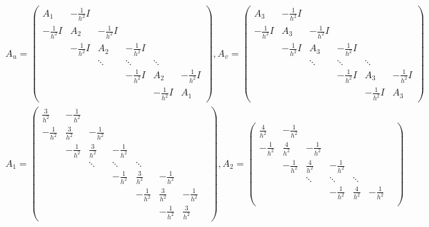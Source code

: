 \documentclass{article}
\begin{document}
\begin{equation*}
  \begin{aligned}
    & A_{u}=
    \begin{pmatrix}
    A_{1} & -\frac{1}{h^{2}}I \\
    -\frac{1}{h^{2}}I & A_{2} & -\frac{1}{h^{2}}I \\
    & -\frac{1}{h^{2}}I & A_{2} & -\frac{1}{h^{2}}I \\
    & & \ddots & \ddots & \ddots \\
    & & & -\frac{1}{h^{2}}I & A_{2} & -\frac{1}{h^{2}}I \\
    & & & & -\frac{1}{h^{2}}I & A_{1}
    \end{pmatrix},A_{v}=
    \begin{pmatrix}
    A_{3} & -\frac{1}{h^{2}}I \\
    -\frac{1}{h^{2}}I & A_{3} & -\frac{1}{h^{2}}I \\
    & -\frac{1}{h^{2}}I & A_{3} & -\frac{1}{h^{2}}I \\
    & & \ddots & \ddots & \ddots \\
    & & & -\frac{1}{h^{2}}I & A_{3} & -\frac{1}{h^{2}}I \\
    & & & & -\frac{1}{h^{2}}I & A_{3}
    \end{pmatrix} \\
    & A_1=
    \begin{pmatrix}
    \frac{3}{h^2} & -\frac{1}{h^2} & & & & & & \\
    -\frac{1}{h^2} & \frac{3}{h^2} & -\frac{1}{h^2} & & & & & \\
    & -\frac{1}{h^2} & \frac{3}{h^2} & -\frac{1}{h^2} & & & & \\
    & & \ddots & \ddots & \ddots & & & \\
    & & & -\frac{1}{h^2} & \frac{3}{h^2} & -\frac{1}{h^2} & & \\
    & & & & -\frac{1}{h^2} & \frac{3}{h^2} & -\frac{1}{h^2} & \\
    & & & & & -\frac{1}{h^2} & \frac{3}{h^2} & 
    \end{pmatrix},A_2=
    \begin{pmatrix}
    \frac{4}{h^2} & -\frac{1}{h^2} & & & & \\
    -\frac{1}{h^2} & \frac{4}{h^2} & -\frac{1}{h^2} & & & \\
    & -\frac{1}{h^2} & \frac{4}{h^2} & -\frac{1}{h^2} & & \\
    & & \ddots & \ddots & \ddots & & \\
    & & & -\frac{1}{h^2} & \frac{4}{h^2} & -\frac{1}{h^2} & \\

\end{pmatrix}
\end{aligned}
\end{equation*}
\end{document}

